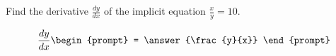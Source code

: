 \documentclass{ximera}
\author{Gregory Hartman \and Matthew Carr}
\begin{document}
\begin{exercise}



Find the derivative $\frac{dy}{dx}$ of the implicit equation $\frac{x}{y}=10$.

\[
\frac{dy}{dx}
\begin{prompt}
= \answer{\frac{y}{x}}
\end{prompt}
\]

\end{exercise}
\end{document}
